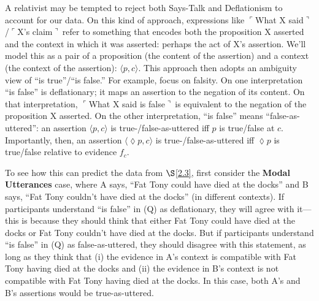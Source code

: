 \documentclass[11pt]{article}
\newcommand{\ul}{$\ulcorner$}
\newcommand{\ur}{$\urcorner\ $}
\newcommand{\urn}{$\urcorner$}
\begin{document}
\begin{doublespace}
A relativist may be tempted to reject both {\sc Says-Talk} and {\sc Deflationism} to account for our data. On this kind of approach, expressions like \ul What X said\urn/\ul X's claim\ur refer to something that encodes both the proposition X asserted and the context in which it was asserted: perhaps the act of X's assertion. We'll model this as a pair of a proposition (the content of the assertion) and a context (the context of the assertion): $\langle p,c\rangle$. This approach then adopts an ambiguity view of ``is true''/``is false.'' For example, focus on falsity. On one interpretation ``is false'' is deflationary; it maps an assertion to the negation of its content. On that interpretation, \ul What X said is false\ur is equivalent to the negation of the proposition X asserted. On the other interpretation, ``is false'' means ``false-as-uttered'': an assertion $\langle p,c\rangle$ is true-/false-as-uttered iff $p$ is true/false at $c$. Importantly, then, an assertion $\langle \lozenge p, c\rangle$ is true-/false-as-uttered iff $\lozenge p$ is true/false relative to evidence $f_c$. 

To see how this can predict the data from $\S$\ref{2.3}, first consider the {\bf Modal Utterances} case, where A says, ``Fat Tony could have died at the docks'' and B says, ``Fat Tony couldn't have died at the docks'' (in different contexts). If participants understand ``is false'' in (Q) as deflationary, they will agree with it---this is because they should think that either Fat Tony could have died at the docks or Fat Tony couldn't have died at the docks. But if participants understand ``is false'' in (Q) as false-as-uttered, they should disagree with this statement, as long as they think that (i) the evidence in A's context is compatible with Fat Tony having died at the docks and (ii) the evidence in B's context is not compatible with Fat Tony having died at the docks. In this case, both A's and B's assertions would be true-as-uttered.  


\end{doublespace}
\end{document}
